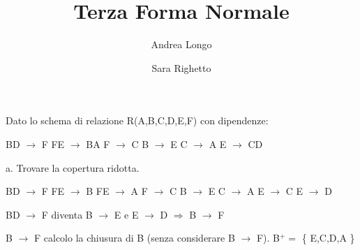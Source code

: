 \documentclass[12pt,a4paper]{article}
\begin{document}
    \author{Andrea Longo \and Sara Righetto}
    \title{Terza Forma Normale}
    \maketitle

    Dato lo schema di relazione R(A,B,C,D,E,F) con dipendenze: \newline

    \noindent
    BD $\rightarrow$ F \newline
    FE $\rightarrow$ BA \newline
    F $\rightarrow$ C \newline
    B $\rightarrow$ E \newline
    C $\rightarrow$ A \newline
    E $\rightarrow$ CD \newline

    \noindent
    a. Trovare la copertura ridotta.  \newline

    \noindent
    BD $\rightarrow$ F \newline
    FE $\rightarrow$ B \newline
    FE $\rightarrow$ A \newline
    F $\rightarrow$ C \newline
    B $\rightarrow$ E \newline
    C $\rightarrow$ A \newline
    E $\rightarrow$ C \newline
    E $\rightarrow$ D \newline

     \newline

    \noindent 
    BD $\rightarrow$ F diventa B $\rightarrow$ E e E $\rightarrow$ D $\Rightarrow$ B $\rightarrow$ F \newline

     \newline

    \noindent %
    B $\rightarrow$ F calcolo la chiusura di B (senza considerare B $\rightarrow$ F). \newline
    B$^+ =$ \{ E,C,D,A \} \newline
\end{document}
